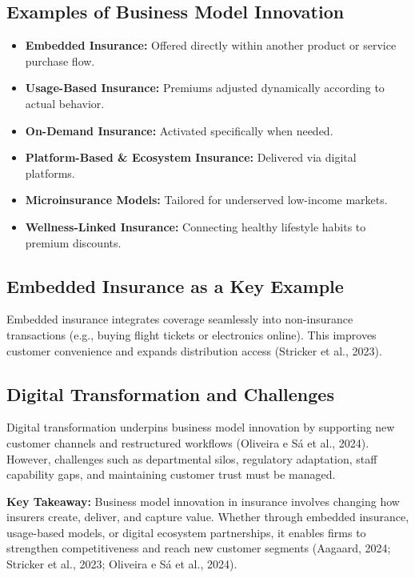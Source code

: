 \documentclass[12pt,a4paper]{article}
\begin{document}
\subsection{Examples of Business Model Innovation}
\begin{itemize}
    \item \textbf{Embedded Insurance:} Offered directly within another product or service purchase flow.
    \item \textbf{Usage-Based Insurance:} Premiums adjusted dynamically according to actual behavior.
    \item \textbf{On-Demand Insurance:} Activated specifically when needed.
    \item \textbf{Platform-Based \& Ecosystem Insurance:} Delivered via digital platforms.
    \item \textbf{Microinsurance Models:} Tailored for underserved low-income markets.
    \item \textbf{Wellness-Linked Insurance:} Connecting healthy lifestyle habits to premium discounts.
\end{itemize}

\subsection{Embedded Insurance as a Key Example}
Embedded insurance integrates coverage seamlessly into non-insurance transactions (e.g., buying flight tickets or electronics online). This improves customer convenience and expands distribution access (Stricker et al., 2023).

\subsection{Digital Transformation and Challenges}
Digital transformation underpins business model innovation by supporting new customer channels and restructured workflows (Oliveira e Sá et al., 2024). However, challenges such as departmental silos, regulatory adaptation, staff capability gaps, and maintaining customer trust must be managed.

\begin{example}
\textbf{Key Takeaway:} Business model innovation in insurance involves changing how insurers create, deliver, and capture value. Whether through embedded insurance, usage-based models, or digital ecosystem partnerships, it enables firms to strengthen competitiveness and reach new customer segments (Aagaard, 2024; Stricker et al., 2023; Oliveira e Sá et al., 2024).
\end{example}
\end{document}
